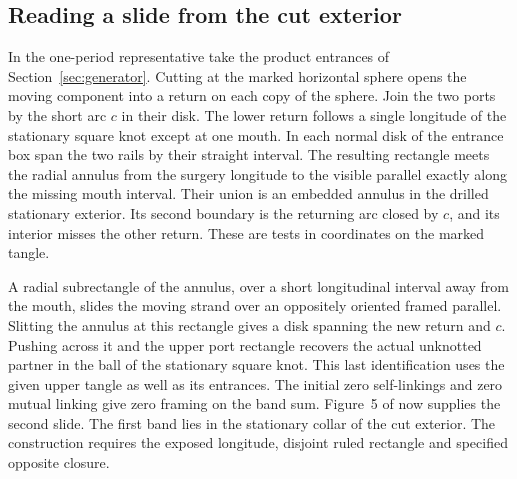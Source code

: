 \documentclass[11pt,letterpaper]{article}
\numberwithin{equation}{section}
\theoremstyle{remark}
\begin{document}
\subsection{Reading a slide from the cut exterior}
In the one-period representative take the product entrances of
Section~\ref{sec:generator}. Cutting at the marked horizontal sphere
opens the moving component into a return on each copy of the sphere.
Join the two ports by the short arc \(c\) in their disk. The lower
return follows a single longitude of the stationary square knot except
at one mouth. In each normal disk of the entrance box span the two
rails by their straight interval. The resulting rectangle meets the
radial annulus from the surgery longitude to the visible parallel
exactly along the missing mouth interval. Their union is an embedded
annulus in the drilled stationary exterior. Its second boundary is
the returning arc closed by \(c\), and its interior misses the other
return. These are tests in coordinates on the marked tangle.

A radial subrectangle of the annulus, over a short longitudinal
interval away from the mouth, slides the moving strand over an
oppositely oriented framed parallel. Slitting the annulus at this
rectangle gives a disk spanning the new return and \(c\). Pushing
across it and the upper port rectangle recovers the actual unknotted
partner in the ball of the stationary square knot. This last
identification uses the given upper tangle as well as its entrances.
The initial zero self-linkings and zero mutual linking give
zero framing on the band sum. Figure~5 of
\cite{GompfScharlemannThompson2010} now supplies the second slide.
The first band lies in the stationary collar of the cut exterior.
The construction requires the exposed longitude, disjoint ruled
rectangle and specified opposite closure.
\end{document}
